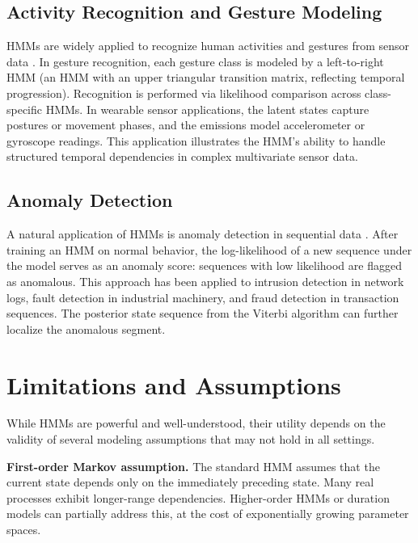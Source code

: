 \documentclass[conference]{IEEEtran}
\begin{document}
\subsection{Activity Recognition and Gesture Modeling}

HMMs are widely applied to recognize human activities and gestures from sensor data \cite{yamato1992recognizing}. In gesture recognition, each gesture class is modeled by a left-to-right HMM (an HMM with an upper triangular transition matrix, reflecting temporal progression). Recognition is performed via likelihood comparison across class-specific HMMs. In wearable sensor applications, the latent states capture postures or movement phases, and the emissions model accelerometer or gyroscope readings. This application illustrates the HMM's ability to handle structured temporal dependencies in complex multivariate sensor data.

\subsection{Anomaly Detection}

A natural application of HMMs is anomaly detection in sequential data \cite{lane1999temporal}. After training an HMM on normal behavior, the log-likelihood of a new sequence under the model serves as an anomaly score: sequences with low likelihood are flagged as anomalous. This approach has been applied to intrusion detection in network logs, fault detection in industrial machinery, and fraud detection in transaction sequences. The posterior state sequence from the Viterbi algorithm can further localize the anomalous segment.

\section{Limitations and Assumptions}
\label{sec:limitations}

While HMMs are powerful and well-understood, their utility depends on the validity of several modeling assumptions that may not hold in all settings.

\textbf{First-order Markov assumption.} The standard HMM assumes that the current state depends only on the immediately preceding state. Many real processes exhibit longer-range dependencies. Higher-order HMMs or duration models can partially address this, at the cost of exponentially growing parameter spaces.
\end{document}
